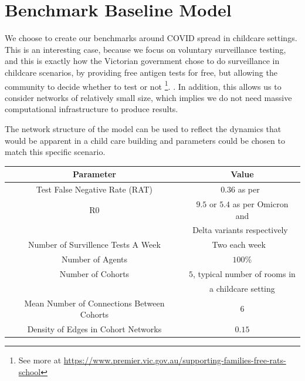 \documentclass{article}
\begin{document}
\newpage
\section{Benchmark Baseline Model}

We choose to create our benchmarks around COVID spread in childcare settings. 
This is an interesting case, because we focus on voluntary surveillance testing, and this is exactly how the Victorian government chose to do surveillance in childcare scenarios, by providing free antigen tests for free, but allowing the community to decide whether to test or not \footnote{See more at \url{https://www.premier.vic.gov.au/supporting-families-free-rats-school}}.  .  
In addition, this allows us to consider networks of relatively small size, which implies we do not need massive computational infrastructure to produce results. \newline 


The network structure of the model can be used to reflect the dynamics that would be apparent in a child care building and parameters could be chosen to match this specific scenario.\newline

\begin{tabular}{|c|c|}
\hline
\textbf{Parameter} & \textbf{Value} \\ \hline
Test False Negative Rate (RAT) & $0.36$ as per~\cite{van_de_mortel_2022} \\ \hline
R0 &  $9.5$ or $5.4$ as per Omicron and  \\
&  Delta variants respectively~\cite{liu_rocklov_2022} \\ \hline
Number of Survillence Tests A Week&  Two each week ~\cite{premier_of_victoria_2022} \\ \hline
Number of Agents & $100$\% \\ \hline
Number of Cohorts & $5$, typical number of rooms in  \\ 
& a childcare setting \\\hline
Mean Number of Connections Between Cohorts  & $6$ \\ \hline
Density of Edges in Cohort Networks  & $0.15$ \\ \hline
\end{tabular}
\newline
\end{document}
